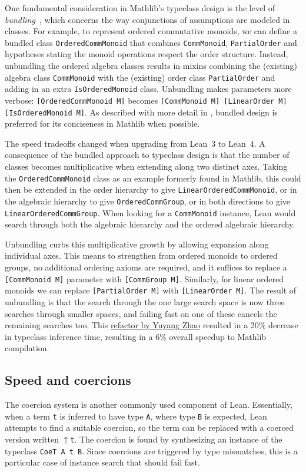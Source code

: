 \documentclass[runningheads]{llncs}
\def\mathlib{Mathlib\xspace}
\newcommand{\lean}[1]{\texttt{#1}}
\begin{document}
One fundamental consideration in \mathlib's typeclass design is the level of \emph{bundling}~\cites{BaanenUseAndAbuse, Mathlib},
which concerns the way conjunctions of assumptions are modeled in classes.
For example, to represent ordered commutative monoids,
we can define a bundled class \lean{OrderedCommMonoid} that combines \lean{CommMonoid}, \lean{PartialOrder} and hypotheses stating the monoid operations respect the order structure.
Instead, unbundling the ordered algebra classes results in mixins combining the (existing) algebra class \lean{CommMonoid} with the (existing) order class \lean{PartialOrder} and adding in an extra \lean{IsOrderedMonoid} class.
Unbundling makes parameters more verbose: \lean{[OrderedCommMonoid M]} becomes \lean{[CommMonoid M] [LinearOrder M] [IsOrderedMonoid M]}.
As described with more detail in \cite{BaanenUseAndAbuse}, bundled design is preferred for its conciseness in \mathlib when possible.

The speed tradeoffs changed when upgrading from Lean~3 to Lean~4.
A consequence of the bundled approach to typeclass design
is that the number of classes becomes multiplicative when extending along two distinct axes.
Taking the \lean{OrderedCommMonoid} class as an example formerly found in \mathlib,
this could then be extended in the order hierarchy to give \lean{LinearOrderedCommMonoid}, or in the algebraic hierarchy to give \lean{OrderedCommGroup}, or in both directions to give \lean{LinearOrderedCommGroup}.
When looking for a \lean{CommMonoid} instance, Lean would search through both the algebraic hierarchy and the ordered algebraic hierarchy.

Unbundling curbs this multiplicative growth by allowing expansion along individual axes.
This means to strengthen from ordered monoids to ordered groups, no additional ordering axioms are required,
and it suffices to replace a \lean{[CommMonoid M]} parameter with \lean{[CommGroup M]}.
Similarly, for linear ordered monoids we can replace \lean{[PartialOrder M]} with \lean{[LinearOrder M]}.
The result of unbundling is that the search through the one large search space is now three searches through smaller spaces,
and failing fast on one of these cancels the remaining searches too.
This \href{https://github.com/leanprover-community/mathlib4/pull/20676}{refactor by Yuyang Zhao} resulted in a 20\% decrease in typeclass inference time,
resulting in a 6\% overall speedup to \mathlib compilation.

\subsection{Speed and coercions}
The coercion system is another commonly used component of Lean.
Essentially, when a term \lean{t} is inferred to have type \lean{A}, where type \lean{B} is expected,
Lean attempts to find a suitable coercion, so the term can be replaced with a coerced version written $\uparrow$\lean{t}. %
The coercion is found by synthesizing an instance of the typeclass \lean{CoeT A t B}.
Since coercions are triggered by type mismatches, this is a particular case of instance search that should fail fast.
\end{document}
